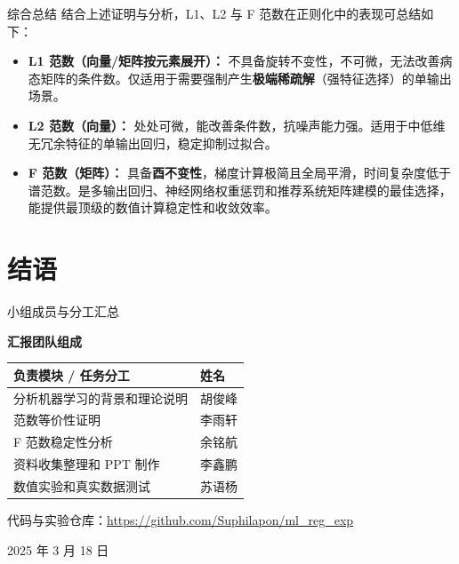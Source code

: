 \documentclass[aspectratio=169]{beamer}
\begin{document}
\begin{frame}{综合总结}
    结合上述证明与分析，L1、L2 与 F 范数在正则化中的表现可总结如下：
    
    \begin{itemize}
        \item \textbf{L1 范数（向量/矩阵按元素展开）：} 不具备旋转不变性，不可微，无法改善病态矩阵的条件数。仅适用于需要强制产生\textbf{极端稀疏解}（强特征选择）的单输出场景。
        \vspace{0.3cm}
        \item \textbf{L2 范数（向量）：} 处处可微，能改善条件数，抗噪声能力强。适用于中低维无冗余特征的单输出回归，稳定抑制过拟合。
        \vspace{0.3cm}
        \item \textbf{F 范数（矩阵）：} 具备\textbf{酉不变性}，梯度计算极简且全局平滑，时间复杂度低于谱范数。是多输出回归、神经网络权重惩罚和推荐系统矩阵建模的最佳选择，能提供最顶级的数值计算稳定性和收敛效率。
    \end{itemize}
\end{frame}


\section*{结语}

\begin{frame}{小组成员与分工汇总}
    \begin{center}
        \Large{\textbf{汇报团队组成}}
    \end{center}
    \vspace{0.5cm}
    
    \begin{table}[h]
        \centering
        \renewcommand{\arraystretch}{1.5}
        \begin{tabular}{p{6.5cm} p{2.5cm}}
            \toprule
            \textbf{负责模块 / 任务分工} & \textbf{姓名} \\
            \midrule
            分析机器学习的背景和理论说明 & 胡俊峰 \\
            范数等价性证明 & 李雨轩 \\
            F 范数稳定性分析 & 余铭航 \\
            资料收集整理和 PPT 制作 & 李鑫鹏 \\
            数值实验和真实数据测试 & 苏语杨 \\
            \bottomrule
        \end{tabular}
    \end{table}
    
    \vspace{0.4cm}
    \begin{center}
        \small 代码与实验仓库：\url{https://github.com/Suphilapon/ml_reg_exp}
    \end{center}
    \vspace{0.3cm}
    \begin{center}
        \small 2025 年 3 月 18 日
    \end{center}
\end{frame}
\end{document}
